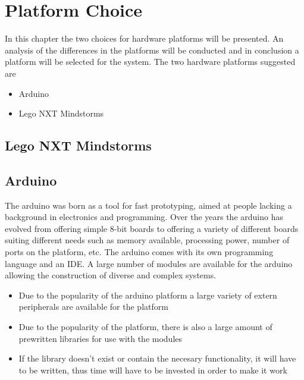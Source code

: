 \chapter{Platform Choice}
In this chapter the two choices for hardware platforms will be presented. An analysis of the differences in the platforms will be conducted and in conclusion a platform will be selected for the system. The two hardware platforms suggested are
\begin{itemize}
	\item Arduino
	\item Lego NXT Mindstorms
\end{itemize}

\section{Lego NXT Mindstorms}

\section{Arduino}
The arduino was born as a tool for fast prototyping, aimed at people lacking a background in electronics and programming. Over the years the arduino has evolved from offering simple 8-bit boards to offering a variety of different boards suiting different needs such as memory available, processing power, number of ports on the platform, etc. The arduino comes with its own programming language and an IDE. A large number of modules are available for the arduino allowing the construction of diverse and complex systems. 
\begin{itemize}
	\item Due to the popularity of the arduino platform a large variety of extern peripherals are available for the platform
	\item Due to the popularity of the platform, there is also a large amount of prewritten libraries for use with the modules
	\item If the library doesn't exist or contain the necesary functionality, it will have to be written, thus time will have to be invested in order to make it work
\end{itemize}
